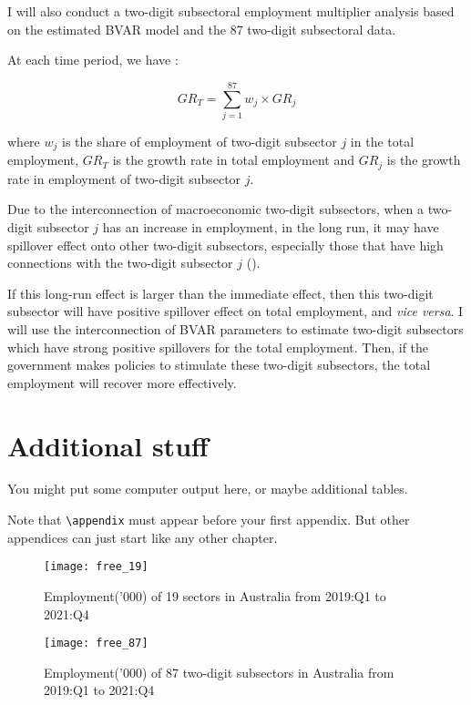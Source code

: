 \documentclass{monashthesis}
\begin{document}
I will also conduct a two-digit subsectoral employment multiplier analysis based on the estimated BVAR model and the 87 two-digit subsectoral data.

At each time period, we have :

\[
GR_T=\sum_{j=1}^{87} w_j\times {GR}_j
\]

where \(w_j\) is the share of employment of two-digit subsector \(j\) in the total employment, \(GR_T\) is the growth rate in total employment and \(GR_j\) is the growth rate in employment of two-digit subsector \(j\).

Due to the interconnection of macroeconomic two-digit subsectors, when a two-digit subsector \(j\) has an increase in employment, in the long run, it may have spillover effect onto other two-digit subsectors, especially those that have high connections with the two-digit subsector \(j\) (\textcite{anderson2020}).

If this long-run effect is larger than the immediate effect, then this two-digit subsector will have positive spillover effect on total employment, and \emph{vice versa}. I will use the interconnection of BVAR parameters to estimate two-digit subsectors which have strong positive spillovers for the total employment. Then, if the government makes policies to stimulate these two-digit subsectors, the total employment will recover more effectively.

\newpage

\appendix

\hypertarget{additional-stuff}{%
\chapter{Additional stuff}\label{additional-stuff}}

You might put some computer output here, or maybe additional tables.

Note that \texttt{\textbackslash{}appendix} must appear before your first appendix. But other appendices can just start like any other chapter.

\graphicspath{ {/Users/elvisyang/Desktop/hon_proj/Disaggregated_Employment/Honours_thesis/figures} }

\begin{figure}[t]
\texttt{[image: free\_19]}
\centering
\caption{Employment('000) of 19 sectors in Australia from 2019:Q1 to 2021:Q4}
\label{fig:19}
\end{figure}

\begin{figure}[t]
\texttt{[image: free\_87]}
\centering
\caption{Employment('000) of 87 two-digit subsectors in Australia from 2019:Q1 to 2021:Q4}
\label{fig:87}
\end{figure}
\end{document}
